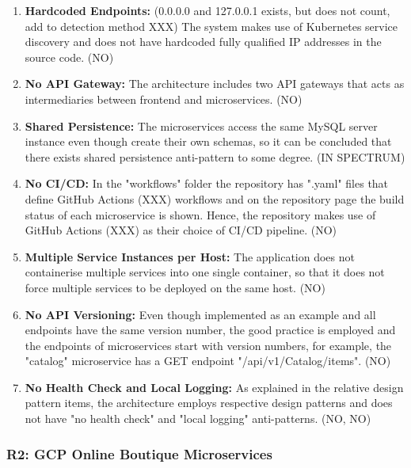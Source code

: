 \documentclass{Configuration_Files/PoliMi3i_thesis}
\begin{document}
\begin{enumerate}
    \item \textbf{Hardcoded Endpoints:} (0.0.0.0 and 127.0.0.1 exists, but does not count, add to detection method XXX)
    The system makes use of Kubernetes service discovery and does not have hardcoded fully qualified IP addresses in the source code. (NO)
    
    \item \textbf{No API Gateway:} The architecture includes two API gateways that acts as intermediaries between frontend and microservices. (NO)
    
    \item \textbf{Shared Persistence:} The microservices access the same MySQL server instance even though create their own schemas, so it can be concluded that there exists shared persistence anti-pattern to some degree. (IN SPECTRUM)
    
    \item \textbf{No CI/CD:} In the "workflows" folder the repository has ".yaml" files that define GitHub Actions (XXX) workflows and on the repository page the build status of each microservice is shown.
    Hence, the repository makes use of GitHub Actions (XXX) as their choice of CI/CD pipeline. (NO)
    
    \item \textbf{Multiple Service Instances per Host:} The application does not containerise multiple services into one single container, so that it does not force multiple services to be deployed on the same host. (NO)
    
    \item \textbf{No API Versioning:} Even though implemented as an example and all endpoints have the same version number, the good practice is employed and the endpoints of microservices start with version numbers, for example, the "catalog" microservice has a GET endpoint "/api/v1/Catalog/items". (NO) 
    
    \item \textbf{No Health Check and Local Logging:} As explained in the relative design pattern items, the architecture employs respective design patterns and does not have "no health check" and "local logging" anti-patterns. (NO, NO)
\end{enumerate}

\subsubsection{R2: GCP Online Boutique Microservices}
\label{subsubsec:R2}
\end{document}
